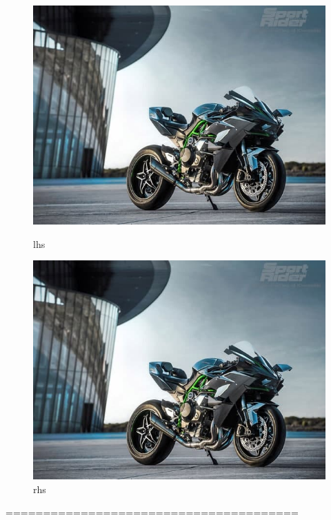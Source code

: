 \documentclass{article}
\begin{document}
	\begin{figure}[H]
		\begin{minipage}{0.5\linewidth}
			\centering
			\includegraphics[width=1\linewidth]{images/h2}
			\caption{lhs}
			\label{fig:h1}
		\end{minipage}
		\hspace{0.5cm}
		\begin{minipage}{0.5\linewidth}
			\centering
			\includegraphics[width=1\linewidth]{images/h2}
			\caption{rhs}
			\label{fig:h3}	
		\end{minipage}		
	\end{figure}
	=======================================	
						
\end{document}
